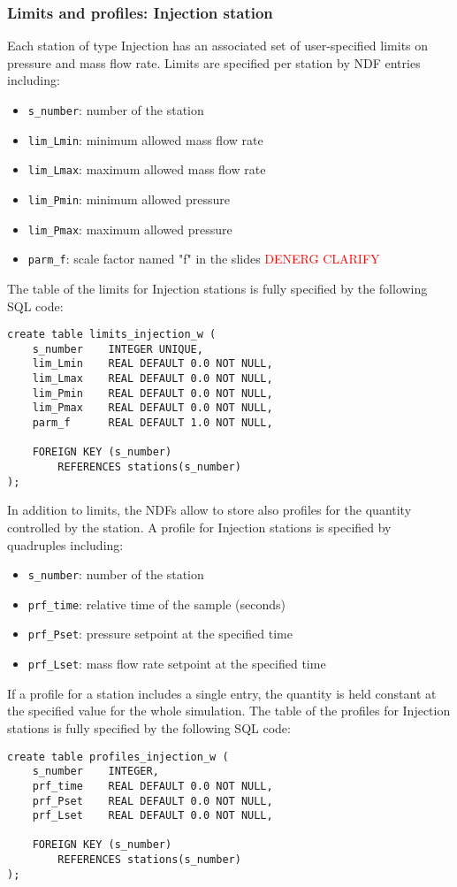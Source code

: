 \subsubsection{Limits and profiles: Injection station}
Each station of type Injection has an associated set of user-specified limits on pressure
and mass flow rate. Limits are specified per station by NDF entries including:
\begin{itemize}
    \item \texttt{s\_number}:   number of the station
    \item \texttt{lim\_Lmin}:   minimum allowed mass flow rate
    \item \texttt{lim\_Lmax}:   maximum allowed mass flow rate
    \item \texttt{lim\_Pmin}:   minimum allowed pressure
    \item \texttt{lim\_Pmax}:   maximum allowed pressure
    \item \texttt{parm\_f}:     scale factor named "f" in the slides \textcolor{red}{DENERG CLARIFY}
\end{itemize}
The table of the limits for Injection stations is fully specified by the following SQL code:
\begin{verbatim}
create table limits_injection_w (
    s_number    INTEGER UNIQUE,
    lim_Lmin    REAL DEFAULT 0.0 NOT NULL,
    lim_Lmax    REAL DEFAULT 0.0 NOT NULL,
    lim_Pmin    REAL DEFAULT 0.0 NOT NULL,
    lim_Pmax    REAL DEFAULT 0.0 NOT NULL,
    parm_f      REAL DEFAULT 1.0 NOT NULL,

    FOREIGN KEY (s_number)
        REFERENCES stations(s_number)
);
\end{verbatim}
In addition to limits, the NDFs allow to store also profiles for the quantity
controlled by the station. A profile for Injection stations is specified by quadruples including:
\begin{itemize}
    \item \texttt{s\_number}:   number of the station
    \item \texttt{prf\_time}:   relative time of the sample (seconds)
    \item \texttt{prf\_Pset}:   pressure setpoint at the specified time
    \item \texttt{prf\_Lset}:   mass flow rate setpoint at the specified time
\end{itemize}
If a profile for a station includes a single entry, the quantity is held constant
at the specified value for the whole simulation. The table of the profiles for
Injection stations is fully specified by the following SQL code:
\begin{verbatim}
create table profiles_injection_w (
    s_number    INTEGER,
    prf_time    REAL DEFAULT 0.0 NOT NULL,
    prf_Pset    REAL DEFAULT 0.0 NOT NULL,
    prf_Lset    REAL DEFAULT 0.0 NOT NULL,

    FOREIGN KEY (s_number)
        REFERENCES stations(s_number)
);
\end{verbatim}

